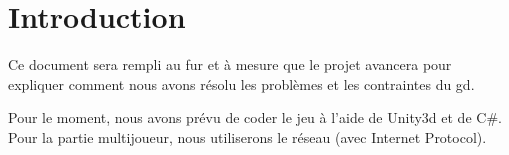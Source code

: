 \part{Introduction}
Ce document sera rempli au fur et à mesure que le projet avancera pour expliquer comment nous avons résolu les problèmes et les contraintes du \acl{gd}.

Pour le moment, nous avons prévu de coder le jeu à l'aide de Unity3d et de C\#.
Pour la partie multijoueur, nous utiliserons le réseau (avec Internet Protocol).

